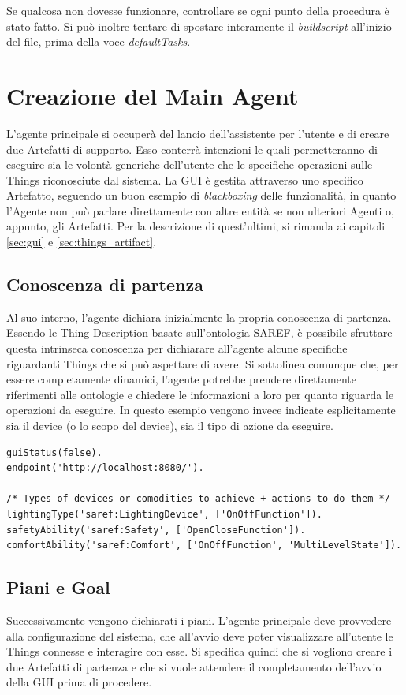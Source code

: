 \documentclass[12pt,a4paper,openright,oneside]{report}
\begin{document}
Se qualcosa non dovesse funzionare, controllare se ogni punto della procedura è stato fatto. Si può inoltre tentare di spostare interamente il \textit{buildscript} all'inizio del file, prima della voce \textit{defaultTasks}. 


\section{Creazione del Main Agent}
L'agente principale si occuperà del lancio dell'assistente per l'utente e di creare due Artefatti di supporto. Esso conterrà intenzioni le quali permetteranno di eseguire sia le volontà generiche dell'utente che le specifiche operazioni sulle Things riconosciute dal sistema. La GUI è gestita attraverso uno specifico Artefatto, seguendo un buon esempio di \textit{blackboxing} delle funzionalità, in quanto l'Agente non può parlare direttamente con altre entità se non ulteriori Agenti o, appunto, gli Artefatti. Per la descrizione di quest'ultimi, si rimanda ai capitoli \ref{sec:gui} e \ref{sec:things_artifact}.\\

\subsection{Conoscenza di partenza}
Al suo interno, l'agente dichiara inizialmente la propria conoscenza di partenza. Essendo le Thing Description basate sull'ontologia SAREF, è possibile sfruttare questa intrinseca conoscenza per dichiarare all'agente alcune specifiche riguardanti Things che si può aspettare di avere. Si sottolinea comunque che, per essere completamente dinamici, l'agente potrebbe prendere direttamente riferimenti alle ontologie e chiedere le informazioni a loro per quanto riguarda le operazioni da eseguire. In questo esempio vengono invece indicate esplicitamente sia il device (o lo scopo del device), sia il tipo di azione da eseguire.\\

\begin{lstlisting}
guiStatus(false).
endpoint('http://localhost:8080/').

/* Types of devices or comodities to achieve + actions to do them */
lightingType('saref:LightingDevice', ['OnOffFunction']).
safetyAbility('saref:Safety', ['OpenCloseFunction']).
comfortAbility('saref:Comfort', ['OnOffFunction', 'MultiLevelState']).
\end{lstlisting}

\subsection{Piani e Goal}
Successivamente vengono dichiarati i piani. L'agente principale deve provvedere alla configurazione del sistema, che all'avvio deve poter visualizzare all'utente le Things connesse e interagire con esse. Si specifica quindi che si vogliono creare i due Artefatti di partenza e che si vuole attendere il completamento dell'avvio della GUI prima di procedere.
\end{document}
